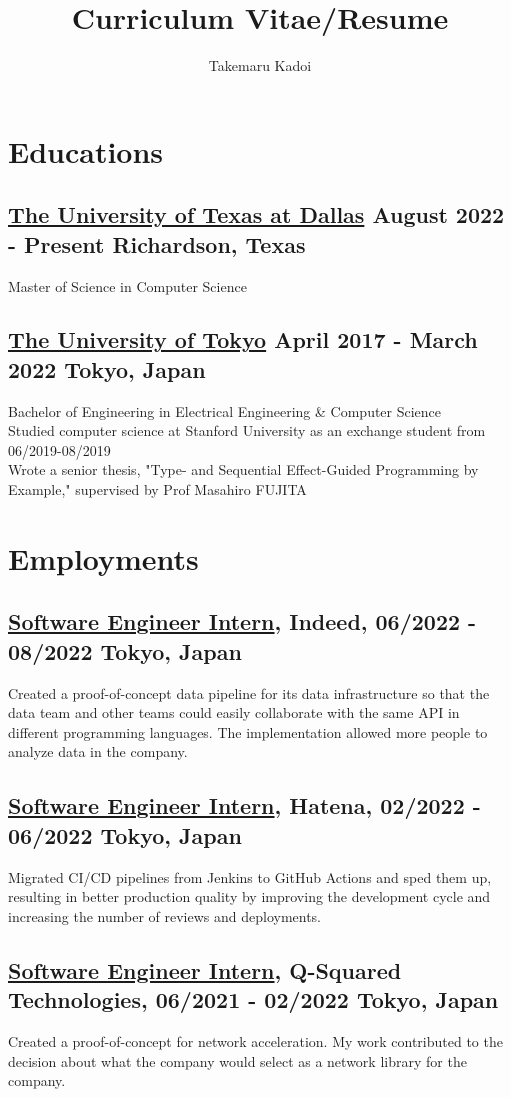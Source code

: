 \documentclass[10pt]{article}
\title{\vspace{-1cm}Curriculum Vitae/Resume}
\author{Takemaru Kadoi}
\date{}
\begin{document}
\section*{Educations}
  \subsection*{\underline{The University of Texas at Dallas} August 2022 - Present \hfill Richardson, Texas}
    Master of Science in Computer Science
  \subsection*{\underline{The University of Tokyo} April 2017 - March 2022 \hfill Tokyo, Japan}
    Bachelor of Engineering in Electrical Engineering \& Computer Science
    \\
    Studied computer science at Stanford University as an exchange student from 06/2019-08/2019
    \\
    Wrote a senior thesis, "Type- and Sequential Effect-Guided Programming by Example," supervised by Prof Masahiro FUJITA

\section*{Employments}
  \subsection*{\underline{Software Engineer Intern}, Indeed, 06/2022 - 08/2022 \hfill Tokyo, Japan}
    Created a proof-of-concept data pipeline for its data infrastructure so that the data team and other teams could easily collaborate with the same API in different programming languages.
    The implementation allowed more people to analyze data in the company.
  \subsection*{\underline{Software Engineer Intern}, Hatena, 02/2022 - 06/2022 \hfill Tokyo, Japan}
    Migrated CI/CD pipelines from Jenkins to GitHub Actions and sped them up, resulting in better production quality by improving the development cycle and increasing the number of reviews and deployments.
  \subsection*{\underline{Software Engineer Intern}, Q-Squared Technologies, 06/2021 - 02/2022 \hfill Tokyo, Japan}
    Created a proof-of-concept for network acceleration.
    My work contributed to the decision about what the company would select as a network library for the company.
\end{document}
